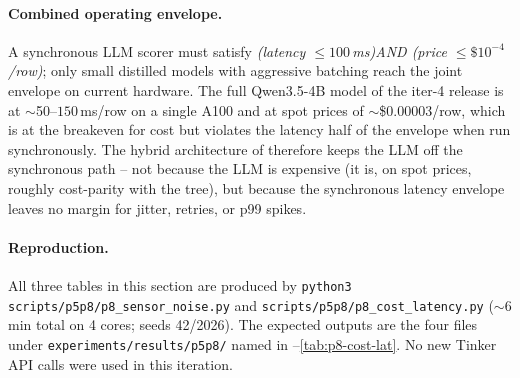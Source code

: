 \paragraph{Combined operating envelope.}
A synchronous LLM scorer must satisfy
\emph{(latency $\le 100\,$ms)AND (price $\le \$10^{-4}$/row)}; only
small distilled models with aggressive batching reach the joint
envelope on current hardware. The full Qwen3.5-4B model of the iter-4
release is at $\sim$50--$150\,$ms/row on a single A100 and at spot
prices of $\sim$\$0.00003/row, which is at the breakeven for cost but
violates the latency half of the envelope when run synchronously. The
hybrid architecture of  therefore keeps the
LLM off the synchronous path -- not because the LLM is expensive
(it is, on spot prices, roughly cost-parity with the tree), but because
the synchronous latency envelope leaves no margin for jitter, retries,
or p99 spikes.

\paragraph{Reproduction.} All three tables in this section are produced
by \texttt{python3 scripts/p5p8/p8\_sensor\_noise.py} and
\texttt{scripts/p5p8/p8\_cost\_latency.py} ($\sim$6 min total on
4 cores; seeds 42/2026). The expected outputs are the four files under
\texttt{experiments/results/p5p8/} named in
--\ref{tab:p8-cost-lat}. No new
Tinker API calls were used in this iteration.